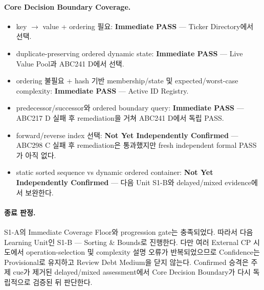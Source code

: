 \paragraph{Core Decision Boundary Coverage.}
\begin{itemize}
\item key $\to$ value + ordering 필요: \textbf{Immediate PASS} --- Ticker Directory에서  선택.
\item duplicate-preserving ordered dynamic state: \textbf{Immediate PASS} --- Live Value Pool과 ABC241 D에서  선택.
\item ordering 불필요 + hash 기반 membership/state 및 expected/worst-case complexity: \textbf{Immediate PASS} --- Active ID Registry.
\item predecessor/successor와 ordered boundary query: \textbf{Immediate PASS} --- ABC217 D 실패 후 remediation을 거쳐 ABC241 D에서 독립 PASS.
\item forward/reverse index 선택: \textbf{Not Yet Independently Confirmed} --- ABC298 C 실패 후 remediation은 통과했지만 fresh independent formal PASS가 아직 없다.
\item static sorted sequence vs dynamic ordered container: \textbf{Not Yet Independently Confirmed} --- 다음 Unit S1-B와 delayed/mixed evidence에서 보완한다.
\end{itemize}

\paragraph{종료 판정.}
S1-A의 Immediate Coverage Floor와 progression gate는 충족되었다. 따라서 다음 Learning Unit인 S1-B --- Sorting \& Bounds로 진행한다. 다만 여러 External CP 시도에서 operation-selection 및 complexity 설명 오류가 반복되었으므로 Confidence는 Provisional로 유지하고 Review Debt Medium을 닫지 않는다. Confirmed 승격은 주제 cue가 제거된 delayed/mixed assessment에서 Core Decision Boundary가 다시 독립적으로 검증된 뒤 판단한다.
